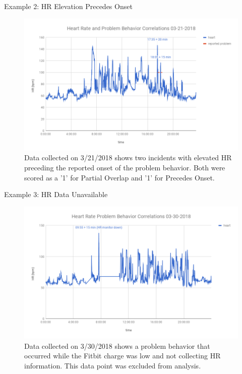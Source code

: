 \documentclass[final]{beamer}
\newlength{\onecolwid}
\newlength{\twocolwid}
\begin{document}
\begin{frame}[t]
\begin{columns}[t]
\begin{column}{\twocolwid}
\begin{columns}[t,totalwidth=\twocolwid]
\begin{column}{\onecolwid}
\begin{block}{Example 2: HR Elevation Precedes Onset}
	\begin{figure}
		\includegraphics[width=0.8\linewidth]{Example2.png}
		\caption{Data collected on 3/21/2018 shows two incidents with elevated HR preceding the reported onset of the problem behavior. Both were scored as a '1' for Partial Overlap and '1' for Precedes Onset.}
	\end{figure}
	
\end{block}


\begin{block}{Example 3: HR Data Unavailable}
	
	\begin{figure}
		\includegraphics[width=0.8\linewidth]{Example3.png}
		\caption{Data collected on 3/30/2018 shows a problem behavior that occurred while the Fitbit charge was low and not collecting HR information. This data point was excluded from analysis.}
	\end{figure}
	
\end{block}



\end{column}
\end{columns}
\end{column}
\end{columns}
\end{frame}
\end{document}
